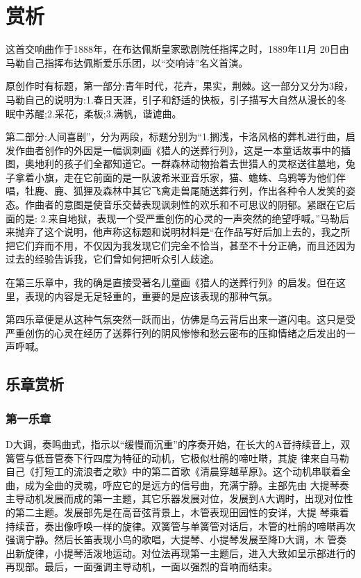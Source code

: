 \documentclass[a4paper,left=2.5cm,right=2.5cm,11pt]{article}
\begin{document}
\section{赏析}
	这首交响曲作于1888年，在布达佩斯皇家歌剧院任指挥之时，1889年11月 20日由马勒自己指挥布达佩斯爱乐乐团，以“交响诗”名义首演。\par
	原创作时有标题，第一部分:青年时代，花卉，果实，荆棘。这一部分又分为3段，马勒自己的说明为:1.春日天涯，引子和舒适的快板，引子描写大自然从漫长的冬眠中苏醒;2.采花，柔板;3.满帆，谐谑曲。\par
	第二部分:人间喜剧”，分为两段，标题分别为“1.搁浅，卡洛风格的葬札进行曲，启发作曲者创作的外因是一幅讽刺画《猎人的送葬行列》，这是一本童话故事中的插图，奥地利的孩子们全都知道它。一群森林动物抬着去世猎人的灵枢送往墓地，兔子拿着小旗，走在它前面的是一队波希米亚音乐家，猫、蟾蛛、乌鸦等为他们伴唱，牡鹿、鹿、狐狸及森林中其它飞禽走兽尾随送葬行列，作出各种令人发笑的姿态。作曲者的意图是使音乐交替表现讽刺性的欢乐和不可思议的阴郁。紧跟在它后面的是: 2.来自地狱，表现一个受严重创伤的心灵的一声突然的绝望呼喊。”马勒后来抛弃了这个说明，他声称这标题和说明材料是“在作品写好后加上去的，我之所把它们弃而不用，不仅因为我发现它们完全不恰当，甚至不十分正确，而且还因为过去的经验告诉我，它们曾如何把听众引人歧途。\par
	在第三乐章中，我的确是直接受著名儿童画《猎人的送葬行列》的启发。但在这里，表现的内容是无足轻重的，重要的是应该表现的那种气氛。\par
	第四乐章便是从这种气氛突然一跃而出，仿佛是乌云背后出来一道闪电。这只是受严重创伤的心灵在经历了送葬行列的阴风惨惨和愁云密布的压抑情绪之后发出的一声呼喊。\par

\subsection{乐章赏析}
\subsubsection{第一乐章}
	D大调，奏鸣曲式，指示以“缓慢而沉重”的序奏开始，在长大的A音持续音上，双簧管与低音管奏下行四度为特征的动机，它极似杜鹃的啼吐啭，其旋 律来自马勒自己《打短工的流浪者之歌》中的第二首歌《清晨穿越草原》。这个动机串联着全曲，成为全曲的灵魂，呼应它的是远方的信号曲，充满宁静。主部先由 大提琴奏主导动机发展而成的第一主题，其它乐器发展对位，发展到A大调时，出现对位性的第二主题。发展部先是在高音弦背景上，木管表现田园性的安详，大提 琴乘着持续音，奏出像呼唤一样的旋律。双簧管与单簧管对话后，木管的杜鹃的啼啭再次强调宁静。然后长笛表现小鸟的歌唱，大提琴、小提琴发展至降D大调，木 管奏出新旋律，小提琴活泼地运动。对位法再现第一主题后，进入大致如呈示部进行的再现部。最后，一面强调主导动机，一面以强烈的音响而结束。
\end{document}
